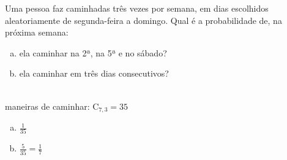 \begin{ex}
Uma pessoa faz caminhadas três vezes por semana, em dias escolhidos aleatoriamente de segunda-feira a domingo. Qual é a probabilidade de, na próxima semana:
   \begin{enumerate}[(a)]
   \item ela caminhar na 2ª, na 5ª e no sábado?
   \item ela caminhar em três dias consecutivos?
   \end{enumerate}
     \begin{sol}
      \phantom{A} \\
      maneiras de caminhar: $\mathrm{C}_{7,3}=35$
        \begin{enumerate} [(a)]
            \item $\frac{1}{35}$
            \item $\frac{5}{35}=\frac{1}{7}$
        \end{enumerate}
     \end{sol}
\end{ex}
